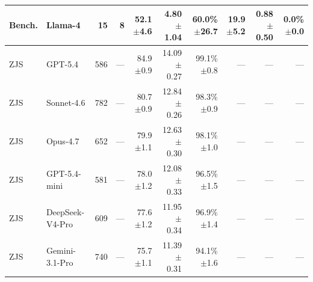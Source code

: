 \begin{table}[t]
{\begin{tabular}{llrrrrrrrr}
Bench. & Llama-4 & 15 & 8 & \shortstack[r]{52.1\\{\scriptsize $\pm$4.6}} & \shortstack[r]{4.80\\{\scriptsize $\pm$1.04}} & \shortstack[r]{60.0\%\\{\scriptsize $\pm$26.7}} & \shortstack[r]{19.9\\{\scriptsize $\pm$5.2}} & \shortstack[r]{0.88\\{\scriptsize $\pm$0.50}} & \shortstack[r]{0.0\%\\{\scriptsize $\pm$0.0}} \\
\midrule
ZJS & GPT-5.4 & 586 & --- & \shortstack[r]{84.9\\{\scriptsize $\pm$0.9}} & \shortstack[r]{14.09\\{\scriptsize $\pm$0.27}} & \shortstack[r]{99.1\%\\{\scriptsize $\pm$0.8}} & --- & --- & --- \\
ZJS & Sonnet-4.6 & 782 & --- & \shortstack[r]{80.7\\{\scriptsize $\pm$0.9}} & \shortstack[r]{12.84\\{\scriptsize $\pm$0.26}} & \shortstack[r]{98.3\%\\{\scriptsize $\pm$0.9}} & --- & --- & --- \\
ZJS & Opus-4.7 & 652 & --- & \shortstack[r]{79.9\\{\scriptsize $\pm$1.1}} & \shortstack[r]{12.63\\{\scriptsize $\pm$0.30}} & \shortstack[r]{98.1\%\\{\scriptsize $\pm$1.0}} & --- & --- & --- \\
ZJS & GPT-5.4-mini & 581 & --- & \shortstack[r]{78.0\\{\scriptsize $\pm$1.2}} & \shortstack[r]{12.08\\{\scriptsize $\pm$0.33}} & \shortstack[r]{96.5\%\\{\scriptsize $\pm$1.5}} & --- & --- & --- \\
ZJS & DeepSeek-V4-Pro & 609 & --- & \shortstack[r]{77.6\\{\scriptsize $\pm$1.2}} & \shortstack[r]{11.95\\{\scriptsize $\pm$0.34}} & \shortstack[r]{96.9\%\\{\scriptsize $\pm$1.4}} & --- & --- & --- \\
ZJS & Gemini-3.1-Pro & 740 & --- & \shortstack[r]{75.7\\{\scriptsize $\pm$1.1}} & \shortstack[r]{11.39\\{\scriptsize $\pm$0.31}} & \shortstack[r]{94.1\%\\{\scriptsize $\pm$1.6}} & --- & --- & --- \\

\end{tabular}}
\end{table}
